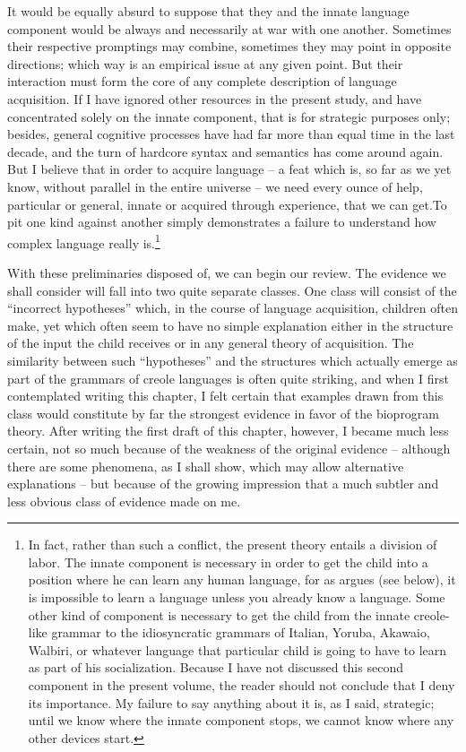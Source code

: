 It would be equally absurd to suppose that they and the innate language component would be always and necessarily at war with one another. Sometimes their respective promptings may combine, sometimes they may point in opposite directions; which way is an empirical issue at any given point. But their interaction must form the core of any complete description of language acquisition. If I have ignored other resources in the present study, and have concentrated solely on the innate component, that is for strategic purposes only; besides, general cognitive processes have had far more than equal time in the last decade, and the turn of hardcore syntax and semantics has come around again. But I believe that in order to acquire language -- a feat which is, so far as we yet know, without parallel in the entire universe -- we need every ounce of help, particular or general, innate or acquired through experience, that we can get.\newpage To pit one kind against another simply demonstrates a failure to understand how complex language really is.\footnote{In fact, rather than such a conflict, the present theory entails a division of labor. The innate component is necessary in order to get the child into a position where he can learn any human language, for as \citet{Fodor1975} argues (see below), it is impossible to learn a language unless you already know a language. Some other kind of component is necessary to get the child from the innate creole-like grammar to the idiosyncratic grammars of Italian, Yoruba, Akawaio, Walbiri, or whatever language that particular child is going to have to learn as part of his socialization. Because I have not discussed this second component in the present volume, the reader should not conclude that I deny its importance. My failure to say anything about it is, as I said, strategic; until we know where the innate component stops, we cannot know where any other devices start.}

With these preliminaries disposed of, we can begin our review. The evidence we shall consider will fall into two quite separate classes. One class will consist of the ``incorrect hypotheses'' which, in the course of language acquisition, children often make, yet which often seem to have no simple explanation either in the structure of the input the child receives or in any general theory of acquisition. The similarity between such ``hypotheses'' and the structures which actually emerge as part of the grammars of creole languages is often quite striking, and when I first contemplated writing this chapter, I felt certain that examples drawn from this class would constitute by far the strongest evidence in favor of the bioprogram theory. After writing the first draft of this chapter, however, I became much less certain, not so much because of the weakness of the original evidence -- although there are some phenomena, as I shall show, which may allow alternative explanations -- but because of the growing impression that a much subtler and less obvious class of evidence made on me.

